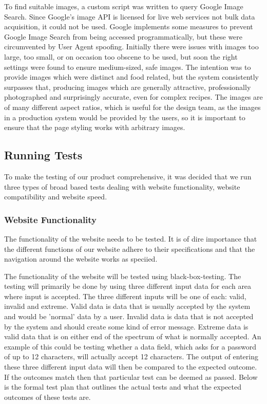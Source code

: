 To find suitable images, a custom script was written to query Google Image Search. Since Google's image API is licensed for live web services not bulk data acquisition, it could not be used. Google implements some measures to prevent Google Image Search from being accessed programmatically, but these were circumvented by User Agent spoofing. Initially there were issues with images too large, too small, or on occasion too obscene to be used, but soon the right settings were found to ensure medium-sized, safe images. The intention was to provide images which were distinct and food related, but the system consistently surpasses that, producing images which are generally attractive, professionally photographed and surprisingly accurate, even for complex recipes. The images are of many different aspect ratios, which is useful for the design team, as the images in a production system would be provided by the users, so it is important to ensure that the page styling works with arbitrary images.



\subsection{Running Tests}                                      %
To make the testing of our product comprehensive, it was decided that we run three types of broad based tests dealing with website functionality, website compatibility and website speed. 

\subsubsection{Website Functionality}
The functionality of the website needs to be tested. It is of dire importance that the different functions of our website adhere to their specifications and that the navigation around the website works as speciied. 

The functionality of the website will be tested using black-box-testing. The testing will primarily be done by using three different input data for each area where input is accepted. The three different inputs will be one of each: valid, invalid and extreme.
Valid data is data that is usually accepted by the system and would be 'normal' data by a user. Invalid data is data that is not accepted by the system and should create some kind of error message. Extreme data is valid data that is on either end of the spectrum of what is normally accepted. An example of this could be testing whether a data field, which asks for a password of up to 12 characters, will actually accept 12 characters. The output of entering these three different input data will then be compared to the expected outcome. If the outcomes match then that particular test can be deemed as passed. Below is the formal test plan that outlines the actual tests and what the expected outcomes of these tests are.
 
